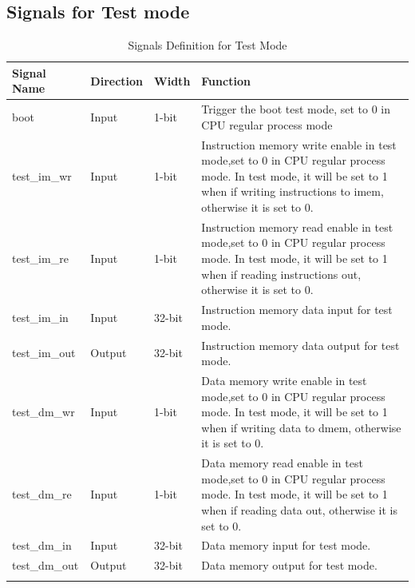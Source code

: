 \documentclass[a4paper]{article}
\begin{document}
\subsection{Signals for Test mode}\label{sub:signal}

\begin{table}[h]
\caption{Signals Definition for Test Mode}\label{tab:signaldef}
\begin{center}
	\begin{tabular}{|l|l|l|p{7cm}|}
	\hline
	\textbf{Signal Name} & \textbf{Direction} & \textbf{Width} & \textbf{Function}\\ \hline \hline
	boot			& Input 	& 1-bit	& Trigger the boot test mode, 
									  set to 0 in CPU regular process mode\\ \hline
	test\_im\_wr 	& Input	& 1-bit	& Instruction memory write enable in test mode,set to 0 in 	
								  CPU regular process mode. In test mode, it will be set to 1 when if writing instructions to imem, otherwise it is set to 0.\\ \hline
	test\_im\_re 	& Input & 1-bit & Instruction memory read enable in test mode,set to 0 in 	
								  CPU regular process mode. In test mode, it will be set to 1 when if reading instructions out, otherwise it is set to 0. \\ \hline
	test\_im\_in 	& Input & 32-bit& Instruction memory data input for test mode. \\ \hline
	test\_im\_out 	& Output& 32-bit& Instruction memory data output for test mode. \\ \hline
	test\_dm\_wr 	& Input	& 1-bit	& Data memory write enable in test mode,set to 0 in 	
								  CPU regular process mode. In test mode, it will be set to 1 when if writing data to dmem, otherwise it is set to 0.\\ \hline
	test\_dm\_re 	& Input & 1-bit & Data memory read enable in test mode,set to 0 in 	
								  CPU regular process mode. In test mode, it will be set to 1 when if reading data out, otherwise it is set to 0.\\ \hline
	test\_dm\_in 	& Input & 32-bit& Data memory input for test mode. \\ \hline
	test\_dm\_out 	& Output& 32-bit& Data memory output for test mode. \\ \hline
	\color{green}{valid}& \color{green}{Output} &\color{green}{1-bit}& \color{green}{If CPU stopped or any exception happens, valid signal is set to 0.}\\ 
	\hline
	\end{tabular}
\end{center}
\end{table}

\subsection{}
\end{document}
